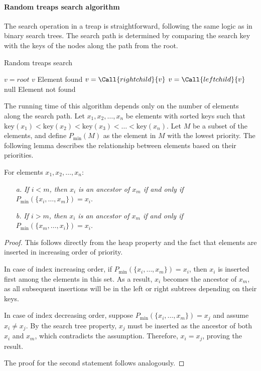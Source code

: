 \paragraph*{Random treaps search algorithm}
The search operation in a treap is straightforward, following the same logic as in binary search trees. 
The search path is determined by comparing the search key with the keys of the nodes along the path from the root.
\begin{algorithm}[H]
    \caption{Random treaps search}
    \begin{algorithmic}[1]
        \State $v = root$
                \State \Return $v$ \Comment Element found
            \EndIf
                \State $v = \Call{rightchild}{v}$
            \EndIf
                \State $v = \Call{leftchild}{v}$
            \EndIf
        \EndWhile
        \State \Return $\text{null}$ \Comment Element not found
    \end{algorithmic}
\end{algorithm}
The running time of this algorithm depends only on the number of elements along the search path.
Let $x_1, x_2,\dots, x_n$ be elements with sorted keys such that $\text{key}(x_1)<\text{key}(x_2) < \text{key}(x_3)< \dots <\text{key}(x_n)$. 
Let $M$ be a subset of the elements, and define $P_{\min}(M)$ as the element in $M$ with the lowest priority. 
The following lemma describes the relationship between elements based on their priorities.
\begin{lemma}
    For elements $x_1,x_2,\dots,x_n$: 
\end{lemma}
\begin{itemize}
    \item[\textit{a.}] \textit{If $i<m$, then $x_i$ is an ancestor of $x_m$ if and only if $P_{\min}(\{x_i,\dots,x_m\})=x_i$}. 
    \item[\textit{b.}] \textit{If $i>m$, then $x_i$ is an ancestor of $x_m$ if and only if $P_{\min}(\{x_m,\dots,x_i\})=x_i$}. 
\end{itemize}
\begin{proof}
    This follows directly from the heap property and the fact that elements are inserted in increasing order of priority. 
    
    In case of index increasing order, if $P_{\min}(\{x_i,\dots,x_m\})=x_i$, then $x_i$ is inserted first among the elements in this set. 
    As a result, $x_i$ becomes the ancestor of $x_m$, as all subsequent insertions will be in the left or right subtrees depending on their keys. 

    In case of index decreasing order, suppose $P_{\min}(\{x_i,\dots,x_m\})=x_j$ and assume $x_i\neq x_j$. 
    By the search tree property, $x_j$ must be inserted as the ancestor of both $x_i$ and $x_m$, which contradicts the assumption. 
    Therefore, $x_i=x_j$, proving the result.

    The proof for the second statement follows analogously.
\end{proof}